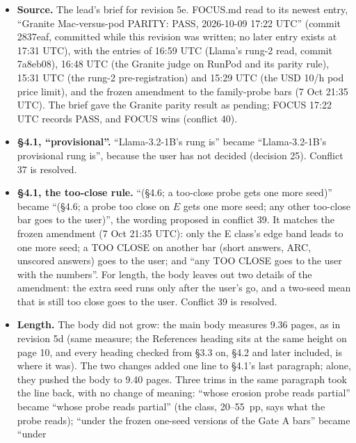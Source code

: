 \documentclass{article}
\theoremstyle{plain}
\theoremstyle{definition}
\theoremstyle{remark}
\begin{document}
\begin{itemize}
  \item \textbf{Source.} The lead's brief for revision 5e. FOCUS.md read to its
        newest entry, ``Granite Mac-versus-pod PARITY: PASS, 2026-10-09 17:22
        UTC'' (commit 2837eaf, committed while this revision was written; no
        later entry exists at 17:31 UTC), with the entries of 16:59 UTC (Llama's
        rung-2 read, commit 7a8eb08), 16:48 UTC (the Granite judge on RunPod and
        its parity rule), 15:31 UTC (the rung-2 pre-registration) and 15:29 UTC
        (the USD 10/h pod price limit), and the frozen amendment to the
        family-probe bars (7 Oct 21:35 UTC). The brief gave the Granite parity
        result as pending; FOCUS 17:22 UTC records PASS, and FOCUS wins
        (conflict 40).
  \item \textbf{\S{}4.1, ``provisional''.} ``Llama-3.2-1B's rung is'' became
        ``Llama-3.2-1B's provisional rung is'', because the user has not decided
        (decision 25). Conflict 37 is resolved.
  \item \textbf{\S{}4.1, the too-close rule.} ``(\S{}4.6; a too-close probe gets
        one more seed)'' became ``(\S{}4.6; a probe too close on $E$ gets one
        more seed; any other too-close bar goes to the user)'', the wording
        proposed in conflict 39. It matches the frozen amendment (7 Oct 21:35
        UTC): only the E class's edge band leads to one more seed; a TOO CLOSE
        on another bar (short answers, ARC, unscored answers) goes to the user;
        and ``any TOO CLOSE goes to the user with the numbers''. For length, the
        body leaves out two details of the amendment: the extra seed runs only
        after the user's go, and a two-seed mean that is still too close goes to
        the user. Conflict 39 is resolved.
  \item \textbf{Length.} The body did not grow: the main body measures 9.36
        pages, as in revision 5d (same measure; the References heading sits at
        the same height on page 10, and every heading checked from \S{}3.3 on,
        \S{}4.2 and later included, is where it was). The two changes added one
        line to \S{}4.1's last paragraph; alone, they pushed the body to 9.40
        pages. Three trims in the same paragraph took the line back, with no
        change of meaning: ``whose erosion probe reads partial'' became ``whose
        probe reads partial'' (the class, 20--55~pp, says what the probe reads);
        ``under the frozen one-seed versions of the Gate A bars'' became ``under

\end{itemize}
\end{document}
